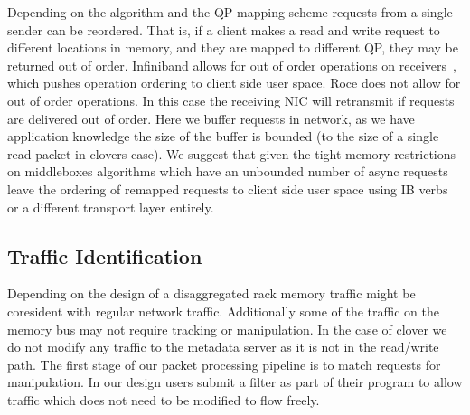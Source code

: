 Depending on the algorithm and the QP mapping scheme requests from a single
sender can be reordered. That is, if a client makes a read and write request to
different locations in memory, and they are mapped to different QP, they may be
returned out of order. Infiniband allows for out of order operations on
receivers~\cite{ib specification}, which pushes operation ordering to client
side user space. Roce does not allow for out of order operations. In this case
the receiving NIC will retransmit if requests are delivered out of order. Here
we buffer requests in network, as we have application knowledge the size of the
buffer is bounded (to the size of a single read packet in clovers case). We
suggest that given the tight memory restrictions on middleboxes algorithms which
have an unbounded number of async requests leave the ordering of remapped
requests to client side user space using IB verbs or a different transport layer
entirely.


\subsection{Traffic Identification} Depending on the design of a disaggregated
rack memory traffic might be coresident with regular network traffic.
Additionally some of the traffic on the memory bus may not require tracking or
manipulation. In the case of clover we do not modify any traffic to the metadata
server as it is not in the read/write path. The first stage of our packet
processing pipeline is to match requests for manipulation. In our design users
submit a filter as part of their program to allow traffic which does not need to
be modified to flow freely.

